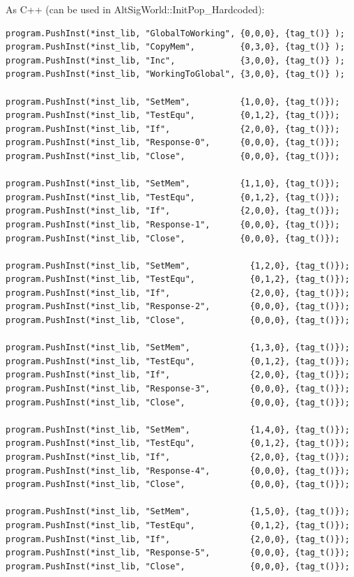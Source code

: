 \documentclass[]{book}
\begin{document}
As C++ (can be used in AltSigWorld::InitPop\_Hardcoded):

\begin{verbatim}
program.PushInst(*inst_lib, "GlobalToWorking", {0,0,0}, {tag_t()} );
program.PushInst(*inst_lib, "CopyMem",         {0,3,0}, {tag_t()} );
program.PushInst(*inst_lib, "Inc",             {3,0,0}, {tag_t()} );
program.PushInst(*inst_lib, "WorkingToGlobal", {3,0,0}, {tag_t()} );

program.PushInst(*inst_lib, "SetMem",          {1,0,0}, {tag_t()});
program.PushInst(*inst_lib, "TestEqu",         {0,1,2}, {tag_t()});
program.PushInst(*inst_lib, "If",              {2,0,0}, {tag_t()});
program.PushInst(*inst_lib, "Response-0",      {0,0,0}, {tag_t()});
program.PushInst(*inst_lib, "Close",           {0,0,0}, {tag_t()});

program.PushInst(*inst_lib, "SetMem",          {1,1,0}, {tag_t()});
program.PushInst(*inst_lib, "TestEqu",         {0,1,2}, {tag_t()});
program.PushInst(*inst_lib, "If",              {2,0,0}, {tag_t()});
program.PushInst(*inst_lib, "Response-1",      {0,0,0}, {tag_t()});
program.PushInst(*inst_lib, "Close",           {0,0,0}, {tag_t()});

program.PushInst(*inst_lib, "SetMem",            {1,2,0}, {tag_t()});
program.PushInst(*inst_lib, "TestEqu",           {0,1,2}, {tag_t()});
program.PushInst(*inst_lib, "If",                {2,0,0}, {tag_t()});
program.PushInst(*inst_lib, "Response-2",        {0,0,0}, {tag_t()});
program.PushInst(*inst_lib, "Close",             {0,0,0}, {tag_t()});

program.PushInst(*inst_lib, "SetMem",            {1,3,0}, {tag_t()});
program.PushInst(*inst_lib, "TestEqu",           {0,1,2}, {tag_t()});
program.PushInst(*inst_lib, "If",                {2,0,0}, {tag_t()});
program.PushInst(*inst_lib, "Response-3",        {0,0,0}, {tag_t()});
program.PushInst(*inst_lib, "Close",             {0,0,0}, {tag_t()});

program.PushInst(*inst_lib, "SetMem",            {1,4,0}, {tag_t()});
program.PushInst(*inst_lib, "TestEqu",           {0,1,2}, {tag_t()});
program.PushInst(*inst_lib, "If",                {2,0,0}, {tag_t()});
program.PushInst(*inst_lib, "Response-4",        {0,0,0}, {tag_t()});
program.PushInst(*inst_lib, "Close",             {0,0,0}, {tag_t()});

program.PushInst(*inst_lib, "SetMem",            {1,5,0}, {tag_t()});
program.PushInst(*inst_lib, "TestEqu",           {0,1,2}, {tag_t()});
program.PushInst(*inst_lib, "If",                {2,0,0}, {tag_t()});
program.PushInst(*inst_lib, "Response-5",        {0,0,0}, {tag_t()});
program.PushInst(*inst_lib, "Close",             {0,0,0}, {tag_t()});


\end{verbatim}
\end{document}
